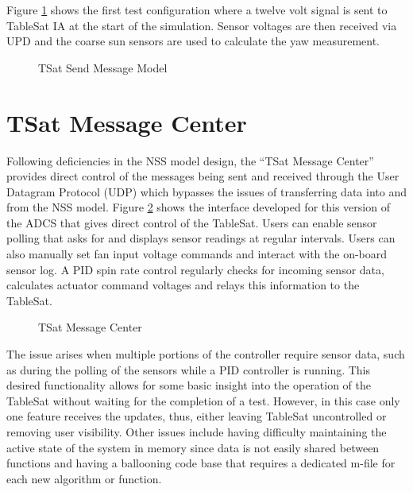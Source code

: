 Figure \ref{fig:TSatSimulinkSendMessageModel} shows the first test configuration where a twelve volt signal is sent to TableSat IA at the start of the simulation.  Sensor voltages are then received via UPD and the coarse sun sensors are used to calculate the yaw measurement.

\begin{figure}[ht]
  \centerline{}
  \caption{TSat Send Message Model}
  \label{fig:TSatSimulinkSendMessageModel}
\end{figure}

\section{TSat Message Center}
\label{sec:TSatMessageCenter}

Following deficiencies in the NSS model design, the ``TSat Message Center'' provides direct control of the messages being sent and received through the User Datagram Protocol (UDP) which bypasses the issues of transferring data into and from the NSS model.  Figure \ref{fig:TSatMessageCenter} shows the interface developed for this version of the ADCS that gives direct control of the TableSat.  Users can enable sensor polling that asks for and displays sensor readings at regular intervals.  Users can also manually set fan input voltage commands and interact with the on-board sensor log.  A PID spin rate control regularly checks for incoming sensor data, calculates actuator command voltages and relays this information to the TableSat.
\begin{figure}[ht]
  \centerline{}
  \caption{TSat Message Center}
  \label{fig:TSatMessageCenter}
\end{figure}

The issue arises when multiple portions of the controller require sensor data, such as during the polling of the sensors while a PID controller is running.  This desired functionality allows for some basic insight into the operation of the TableSat without waiting for the completion of a test.  However, in this case only one feature receives the updates, thus, either leaving TableSat uncontrolled or removing user visibility.  Other issues include having difficulty maintaining the active state of the system in memory since data is not easily shared between functions and having a ballooning code base that requires a dedicated m-file for each new algorithm or function.


